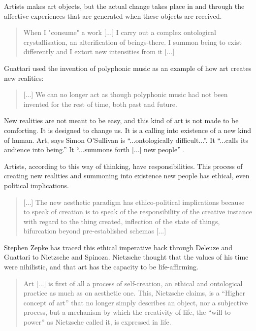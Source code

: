         Artists makes art objects, but the actual change takes place in and through the affective experiences that are generated when these objects are received.

        \begin{quote}
            When I "consume" a work [...] I carry out a complex ontological crystallisation, an alterification of beings-there. I summon being to exist differently and I extort new intensities from it [...] \citep[p.96]{GuattariChsmss1995}
        \end{quote}

        Guattari used the invention of polyphonic music as an example of how art creates new realities:

		\begin{quote}
    		[...] We can no longer act as though polyphonic music had not been invented for the rest of time, both past and future. \citep[pp. 27-28]{GuattariChsmss1995}
		\end{quote}

        New realities are not meant to be easy, and this kind of art is not made to be comforting. It is designed to change us. It is a calling into existence of a new kind of human. Art, says Simon O'Sullivan is “...ontologically difficult...”. It “...calls its audience into being.” It “...summons forth [...] new people” \citep[p.68]{OSullivanArtEncntrs2006}.
        
        Artists, according to this way of thinking, have responsibilities. This process of creating new realities and summoning into existence new people has ethical, even political implications.

		\begin{quote}
		    [...] The new aesthetic paradigm has ethico-political implications because to speak of creation is to speak of the responsibility of the creative instance with regard to the thing created, inflection of the state of things, bifurcation beyond pre-established schemas [...] \citep[p.107]{GuattariChsmss1995}
		\end{quote}

        Stephen Zepke has traced this ethical imperative back through Deleuze and Guattari to Nietzsche and Spinoza. Nietzsche thought that the values of his time were nihilistic, and that art has the capacity to be life-affirming.

        \begin{quote}
            Art [...] is first of all a process of self-creation, an ethical and ontological practice as much as on aesthetic one. This, Nietzsche claims, is a “Higher concept of art” that no longer simply describes an object, nor a subjective process, but a mechanism by which the creativity of life, the “will to power” as Nietzsche called it, is expressed in life. \citep[p.12]{ZepkeArtAsAbstrctMchn2005}
        \end{quote}

